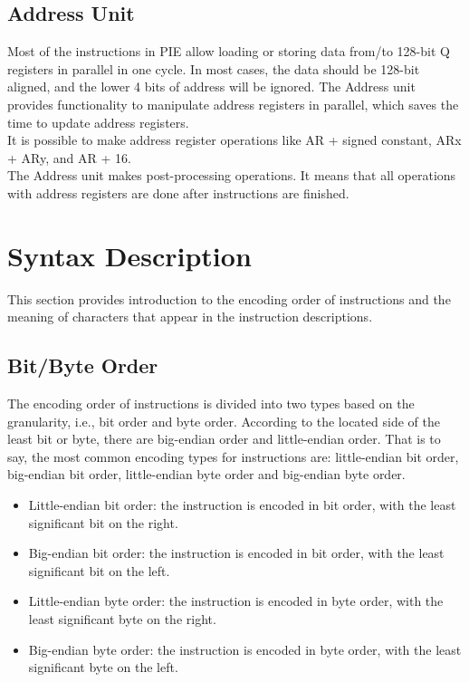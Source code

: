 \documentclass[main\_\_EN.tex]{subfiles}
\begin{document}
\subsection{Address Unit}

Most of the instructions in PIE allow loading or storing data from/to 128-bit Q registers in parallel in one cycle. In most cases, the data should be 128-bit aligned, and the lower 4 bits of address will be ignored. The Address unit provides functionality to manipulate address registers in parallel, which saves the time to update address registers.\\
It is possible to make address register operations like AR + signed constant, ARx + ARy, and AR + 16.\\
The Address unit makes post-processing operations. It means that all operations with address registers are done after instructions are finished.



\section{Syntax Description}

This section provides introduction to the encoding order of instructions and the meaning of characters that appear in the instruction descriptions.

\subsection{Bit/Byte Order}

The encoding order of instructions is divided into two types based on the granularity, i.e., bit order and byte order. According to the located side of the least bit or byte, there are big-endian order and little-endian order. That is to say, the most common encoding types for instructions are: little-endian bit order, big-endian bit order, little-endian byte order and big-endian byte order.

\begin{itemize}
    \item Little-endian bit order: the instruction is encoded in bit order, with the least significant bit on the right.
    \item Big-endian bit order: the instruction is encoded in bit order, with the least significant bit on the left.
    \item Little-endian byte order: the instruction is encoded in byte order, with the least significant byte on the right.
    \item Big-endian byte order: the instruction is encoded in byte order, with the least significant byte on the left.
\end{itemize}
\end{document}
